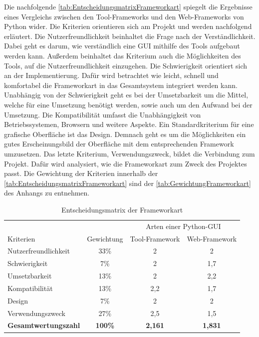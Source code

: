 \documentclass[a4paper,titlepage,halfparskip,12pt]{scrreprt}
\begin{document}
\begin{onehalfspacing}
Die nachfolgende \autoref{tab:EntscheidungsmatrixFrameworkart} spiegelt die Ergebnisse eines Vergleichs zwischen den Tool-Frameworks und den Web-Frameworks von Python wider. Die Kriterien orientieren sich am Projekt und werden nachfolgend erläutert. Die Nutzerfreundlichkeit beinhaltet die Frage nach der Verständlichkeit. Dabei geht es darum, wie verständlich eine GUI mithilfe des Tools aufgebaut werden kann. Außerdem beinhaltet das Kriterium auch die Möglichkeiten des Tools, auf die Nutzerfreundlichkeit einzugehen. Die Schwierigkeit orientiert sich an der Implementierung. Dafür wird betrachtet wie leicht, schnell und komfortabel die Frameworkart in das Gesamtsystem integriert werden kann. Unabhängig von der Schwierigkeit geht es bei der Umsetzbarkeit um die Mittel, welche für eine Umsetzung benötigt werden, sowie auch um den Aufwand bei der Umsetzung. Die Kompatibilität umfasst die Unabhängigkeit von Betriebssystemen, Browsern und weitere Aspekte. Ein Standardkriterium für eine grafische Oberfläche ist das Design. Demnach geht es um die Möglichkeiten ein gutes Erscheinungsbild der Oberfläche mit dem entsprechenden Framework umzusetzen. Das letzte Kriterium, Verwendungszweck, bildet die Verbindung zum Projekt. Dafür wird analysiert, wie die Frameworkart zum Zweck des Projektes passt. Die Gewichtung der Kriterien innerhalb der \autoref{tab:EntscheidungsmatrixFrameworkart} sind der \autoref{tab:GewichtungFrameworkart} des Anhangs zu entnehmen.
\renewcommand{\arraystretch}{2}
\begin{table}[h]
	\centering
	\caption{Entscheidungsmatrix der Frameworkart}
	\begin{tabular}{l|c|c|c}
		& & \multicolumn{2}{c}{Arten einer Python-GUI} \\
		Kriterien & Gewichtung & Tool-Framework & Web-Framework \\
		\hline
		Nutzerfreundlichkeit & 33\% & 2 & 2 \\
		\hline
		Schwierigkeit & 7\% & 2 & 1,7  \\
		\hline
		Umsetzbarkeit & 13\% & 2 & 2,2\\
		\hline
		Kompatibilität & 13\% & 2,2 & 1,7 \\
		\hline
		Design & 7\% & 2 &  2\\
		\hline 
		Verwendungszweck & 27\% & 2,5 & 1,5 \\
		\hline
		\textbf{Gesamtwertungszahl} & \textbf{100\%} & \textbf{2,161} & \textbf{1,831} \\
	\end{tabular}
	\label{tab:EntscheidungsmatrixFrameworkart}

\end{table}
\end{onehalfspacing}
\end{document}

